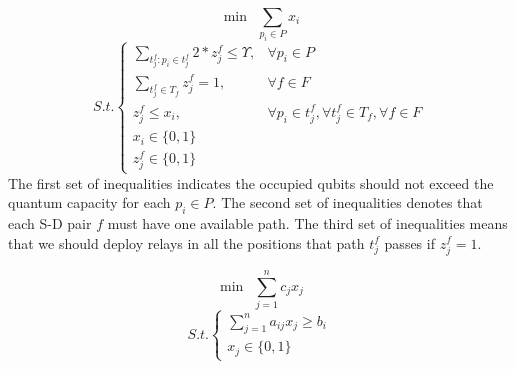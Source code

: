 {\small
	\begin{equation*}
	\min \ \  \sum_{p_i \in P}{x_i}
	\end{equation*}
	\begin{equation}\label{eq:profairness:int_formulation}
	{S.t.}\begin{cases}
	 \sum_{t^f_j: p_i \in t^f_j}{2*z^f_j} \le \Upsilon , & \forall p_i \in P \\
     \sum_{t_j^f \in T_f}{z_j^f} = 1, & \forall f \in F \\
     z_j^f \le x_i, & \forall p_i \in t_j^f, \forall t_j^f \in T_f, \forall f \in F \\
	 x_i \in \{0, 1\}\\
     z^f_j \in \{0,1\}

	\end{cases}
	\end{equation}
The first set of inequalities indicates the occupied qubits should not exceed the quantum capacity for each $p_i \in P$. The second set of inequalities denotes that each S-D pair $f$ must have one available path. The third set of inequalities means that we should deploy relays in all the positions that path $t_j^f$ passes if $z^f_j = 1$.
%

{\small
	\begin{equation*}
	\min \ \  \sum_{j=1}^{n}{c_{j}x_{j}}
	\end{equation*}
	\begin{equation}\label{eq:profairness:01}
	{S.t.}\begin{cases}
	 \sum_{j=1}^{n}{a_{ij}x_j} \ge b_i\\
	 x_j \in \{0, 1\}


\end{cases}
\end{equation}}}
